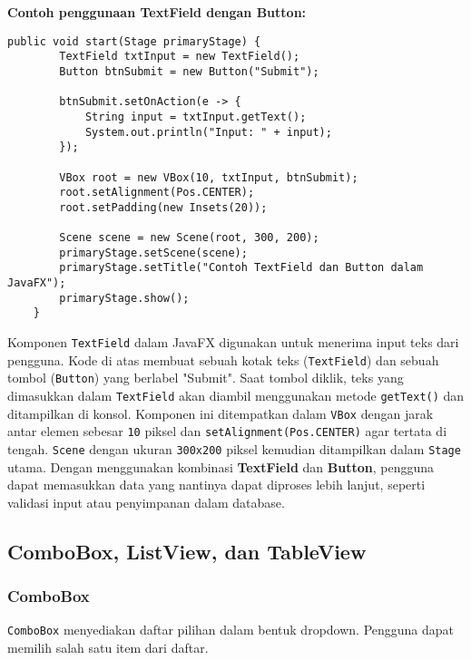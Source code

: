 \textbf{Contoh penggunaan TextField dengan Button:}
\begin{lstlisting}[style=JavaStyle, caption=Mengambil Input dari TextField]
	public void start(Stage primaryStage) {
		TextField txtInput = new TextField();
		Button btnSubmit = new Button("Submit");
		
		btnSubmit.setOnAction(e -> {
			String input = txtInput.getText();
			System.out.println("Input: " + input);
		});
		
		VBox root = new VBox(10, txtInput, btnSubmit);
		root.setAlignment(Pos.CENTER);
		root.setPadding(new Insets(20));
		
		Scene scene = new Scene(root, 300, 200);
		primaryStage.setScene(scene);
		primaryStage.setTitle("Contoh TextField dan Button dalam JavaFX");
		primaryStage.show();
	}
\end{lstlisting}

Komponen \texttt{TextField} dalam JavaFX digunakan untuk menerima input teks dari pengguna. Kode di atas membuat sebuah kotak teks (\texttt{TextField}) dan sebuah tombol (\texttt{Button}) yang berlabel "Submit". Saat tombol diklik, teks yang dimasukkan dalam \texttt{TextField} akan diambil menggunakan metode \texttt{getText()} dan ditampilkan di konsol. Komponen ini ditempatkan dalam \texttt{VBox} dengan jarak antar elemen sebesar \texttt{10} piksel dan \texttt{setAlignment(Pos.CENTER)} agar tertata di tengah. \texttt{Scene} dengan ukuran \texttt{300x200} piksel kemudian ditampilkan dalam \texttt{Stage} utama. Dengan menggunakan kombinasi \textbf{TextField} dan \textbf{Button}, pengguna dapat memasukkan data yang nantinya dapat diproses lebih lanjut, seperti validasi input atau penyimpanan dalam database.



\subsection{ComboBox, ListView, dan TableView}

\subsubsection{ComboBox}

\texttt{ComboBox} menyediakan daftar pilihan dalam bentuk dropdown. Pengguna dapat memilih salah satu item dari daftar.

